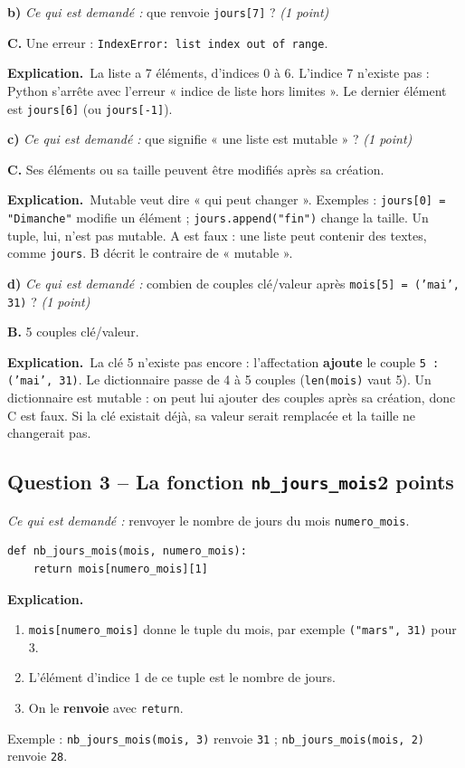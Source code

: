\documentclass[11pt, a4paper]{exam}
\newcommand{\code}[1]{\texttt{#1}}
\newcommand{\Qt}[2]{\subsection*{#1\hfill{\normalfont\small #2}}}
\newcommand{\rappel}[1]{\noindent\textit{Ce qui est demandé :} #1\par\smallskip}
\newcommand{\explication}{\noindent\textbf{Explication.}\ }
\begin{document}
\textbf{b)} \rappel{que renvoie \code{jours[7]} ? \hfill\textit{(1 point)}}
\begin{reponse}
\textbf{C.} Une erreur : \code{IndexError: list index out of range}.
\end{reponse}
\explication La liste a 7 éléments, d'indices 0 à 6. L'indice 7 n'existe pas : Python s'arrête avec l'erreur « indice de liste hors limites ». Le dernier élément est \code{jours[6]} (ou \code{jours[-1]}).

\textbf{c)} \rappel{que signifie « une liste est mutable » ? \hfill\textit{(1 point)}}
\begin{reponse}
\textbf{C.} Ses éléments ou sa taille peuvent être modifiés après sa création.
\end{reponse}
\explication \og Mutable \fg{} veut dire « qui peut changer ». Exemples : \code{jours[0] = "Dimanche"} modifie un élément ; \code{jours.append("fin")} change la taille. Un tuple, lui, n'est pas mutable. A est faux : une liste peut contenir des textes, comme \code{jours}. B décrit le contraire de « mutable ».

\textbf{d)} \rappel{combien de couples clé/valeur après \code{mois[5] = ('mai', 31)} ? \hfill\textit{(1 point)}}
\begin{reponse}
\textbf{B.} 5 couples clé/valeur.
\end{reponse}
\explication La clé 5 n'existe pas encore : l'affectation \textbf{ajoute} le couple \code{5 : ('mai', 31)}. Le dictionnaire passe de 4 à 5 couples (\code{len(mois)} vaut 5). Un dictionnaire est mutable : on peut lui ajouter des couples après sa création, donc C est faux. Si la clé existait déjà, sa valeur serait remplacée et la taille ne changerait pas.

\Qt{Question 3 -- La fonction \code{nb\_jours\_mois}}{2 points}
\rappel{renvoyer le nombre de jours du mois \code{numero\_mois}.}
\begin{reponse}
\begin{lstlisting}
def nb_jours_mois(mois, numero_mois):
    return mois[numero_mois][1]
\end{lstlisting}
\end{reponse}
\explication
\begin{enumerate}
\item \code{mois[numero\_mois]} donne le tuple du mois, par exemple \code{("mars", 31)} pour 3.
\item L'élément d'indice 1 de ce tuple est le nombre de jours.
\item On le \textbf{renvoie} avec \code{return}.
\end{enumerate}
Exemple : \code{nb\_jours\_mois(mois, 3)} renvoie \code{31} ; \code{nb\_jours\_mois(mois, 2)} renvoie \code{28}.
\end{document}
